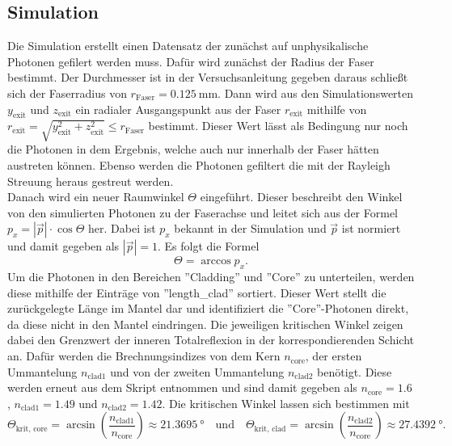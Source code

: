  \subsection{Simulation}
 \label{sec:sim}
 Die Simulation erstellt einen Datensatz der zunächst auf unphysikalische Photonen gefilert werden muss. Dafür wird zunächst der Radius der Faser bestimmt. Der Durchmesser ist in der Versuchsanleitung \cite{Anleitung} gegeben daraus schließt sich der Faserradius von $r_{\text{Faser}} = \SI{0.125}{\milli\meter}$. Dann wird aus den Simulationswerten $y_{\text{exit}}$ und $z_{\text{exit}}$ ein radialer Ausgangspunkt aus der Faser $r_{\text{exit}}$ mithilfe von $r_{\text{exit}} = \sqrt{y_{\text{exit}}^2 + z_{\text{exit}}^2} \leq r_{\text{Faser}}$ bestimmt. Dieser Wert lässt als Bedingung nur noch die Photonen in dem Ergebnis, welche auch nur innerhalb der Faser hätten austreten können. Ebenso werden die Photonen gefiltert die mit der Rayleigh Streuung heraus gestreut werden.\\
 Danach wird ein neuer Raumwinkel $\Theta$ eingeführt. Dieser beschreibt den Winkel von den simulierten Photonen zu der Faserachse und leitet sich aus der Formel $p_x = |\vec{p}| \cdot \cos{\Theta}$ her. Dabei ist $p_x$ bekannt in der Simulation und $\vec{p}$ ist normiert und damit gegeben als $|\vec{p}| = 1$. Es folgt die Formel
 \begin{equation}
    \Theta = \arccos{p_x}.
    \label{eqn:theta}
 \end{equation}
Um die Photonen in den Bereichen ''Cladding'' und ''Core'' zu unterteilen, werden diese mithilfe der Einträge von ''length\_clad'' sortiert. Dieser Wert stellt die zurückgelegte Länge im Mantel dar und identifiziert die ''Core''-Photonen direkt, da diese nicht in den Mantel eindringen. Die jeweiligen kritischen Winkel zeigen dabei den Grenzwert der inneren Totalreflexion in der korrespondierenden Schicht an. Dafür werden die Brechnungsindizes von dem Kern $n_{\text{core}}$, der ersten Ummantelung $n_{\text{clad1}}$ und von der zweiten Ummantelung $n_{\text{clad2}}$ benötigt. Diese werden erneut aus dem Skript entnommen \cite{Anleitung} und sind damit gegeben als $n_{\text{core}} = \num{1.6}$, $n_{\text{clad1}} = \num{1.49}$ und $n_{\text{clad2}} = \num{1.42}$. Die kritischen Winkel lassen sich bestimmen mit
 \begin{equation}
    \Theta_{\text{krit, core}} = \arcsin{\left(\frac{n_{\text{clad1}}}{n_{\text{core}}}\right)} \approx \SI{21.3695}{\degree} \quad \text{und} \quad \Theta_{\text{krit, clad}} = \arcsin{\left(\frac{n_{\text{clad2}}}{n_{\text{core}}}\right)} \approx \SI{27.4392}{\degree}.
    \label{eqn:theta_krit}
 \end{equation}
